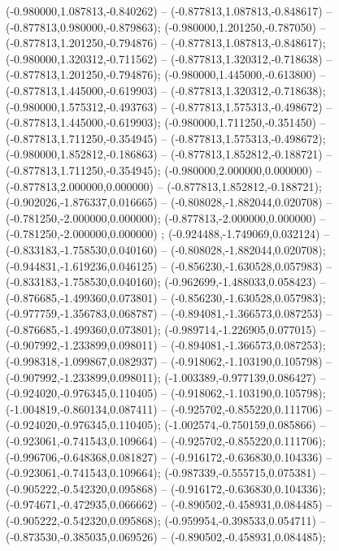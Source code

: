  (-0.980000,1.087813,-0.840262) -- (-0.877813,1.087813,-0.848617) -- (-0.877813,0.980000,-0.879863);
 (-0.980000,1.201250,-0.787050) -- (-0.877813,1.201250,-0.794876) -- (-0.877813,1.087813,-0.848617);
 (-0.980000,1.320312,-0.711562) -- (-0.877813,1.320312,-0.718638) -- (-0.877813,1.201250,-0.794876);
 (-0.980000,1.445000,-0.613800) -- (-0.877813,1.445000,-0.619903) -- (-0.877813,1.320312,-0.718638);
 (-0.980000,1.575312,-0.493763) -- (-0.877813,1.575313,-0.498672) -- (-0.877813,1.445000,-0.619903);
 (-0.980000,1.711250,-0.351450) -- (-0.877813,1.711250,-0.354945) -- (-0.877813,1.575313,-0.498672);
 (-0.980000,1.852812,-0.186863) -- (-0.877813,1.852812,-0.188721) -- (-0.877813,1.711250,-0.354945);
 (-0.980000,2.000000,0.000000) -- (-0.877813,2.000000,0.000000) -- (-0.877813,1.852812,-0.188721);
 (-0.902026,-1.876337,0.016665) -- (-0.808028,-1.882044,0.020708) -- (-0.781250,-2.000000,0.000000);
 (-0.877813,-2.000000,0.000000) -- (-0.781250,-2.000000,0.000000) ;
 (-0.924488,-1.749069,0.032124) -- (-0.833183,-1.758530,0.040160) -- (-0.808028,-1.882044,0.020708);
 (-0.944831,-1.619236,0.046125) -- (-0.856230,-1.630528,0.057983) -- (-0.833183,-1.758530,0.040160);
 (-0.962699,-1.488033,0.058423) -- (-0.876685,-1.499360,0.073801) -- (-0.856230,-1.630528,0.057983);
 (-0.977759,-1.356783,0.068787) -- (-0.894081,-1.366573,0.087253) -- (-0.876685,-1.499360,0.073801);
 (-0.989714,-1.226905,0.077015) -- (-0.907992,-1.233899,0.098011) -- (-0.894081,-1.366573,0.087253);
 (-0.998318,-1.099867,0.082937) -- (-0.918062,-1.103190,0.105798) -- (-0.907992,-1.233899,0.098011);
 (-1.003389,-0.977139,0.086427) -- (-0.924020,-0.976345,0.110405) -- (-0.918062,-1.103190,0.105798);
 (-1.004819,-0.860134,0.087411) -- (-0.925702,-0.855220,0.111706) -- (-0.924020,-0.976345,0.110405);
 (-1.002574,-0.750159,0.085866) -- (-0.923061,-0.741543,0.109664) -- (-0.925702,-0.855220,0.111706);
 (-0.996706,-0.648368,0.081827) -- (-0.916172,-0.636830,0.104336) -- (-0.923061,-0.741543,0.109664);
 (-0.987339,-0.555715,0.075381) -- (-0.905222,-0.542320,0.095868) -- (-0.916172,-0.636830,0.104336);
 (-0.974671,-0.472935,0.066662) -- (-0.890502,-0.458931,0.084485) -- (-0.905222,-0.542320,0.095868);
 (-0.959954,-0.398533,0.054711) -- (-0.873530,-0.385035,0.069526) -- (-0.890502,-0.458931,0.084485);
